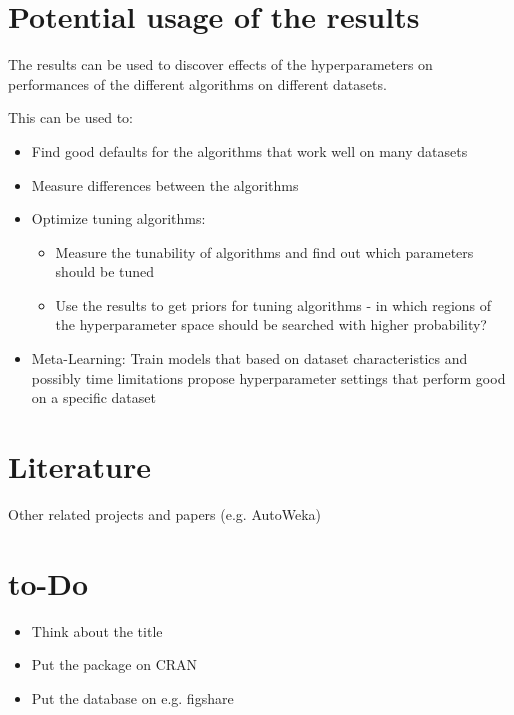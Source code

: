 \documentclass{article}
\begin{document}
\section{Potential usage of the results}

The results can be used to discover effects of the hyperparameters on performances 
of the different algorithms on different datasets. 

This can be used to:
\begin{itemize}
\item Find good defaults for the algorithms that work well on many datasets
\item Measure differences between the algorithms
\item Optimize tuning algorithms:
\begin{itemize}
\item Measure the tunability of algorithms and find out which parameters should be tuned
\item Use the results to get priors for tuning algorithms - in which regions of the 
hyperparameter space should be searched with higher probability?
\end{itemize}
\item Meta-Learning: Train models that based on dataset characteristics and 
possibly time limitations propose hyperparameter settings that perform good 
on a specific dataset
\end{itemize}


\section{Literature}
Other related projects and papers (e.g. AutoWeka)

\section{to-Do}
\begin{itemize}
\item Think about the title
\item Put the package on CRAN
\item Put the database on e.g. figshare
\end{itemize}


 
\end{document}
